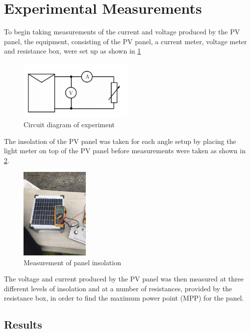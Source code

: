 \documentclass{article}
\begin{document}
	\section{Experimental Measurements}
		To begin taking measurements of the current and voltage produced by the PV panel, the equipment, consisting of the PV panel, a current meter, voltage meter and resistance box, were set up as shown in \cref{fig:circuit}
		\begin{figure}[H]
			\centering
			\includegraphics[width=0.5\textwidth]{circuitdiagram}
			\caption{Circuit diagram of experiment}
			\label{fig:circuit}
		\end{figure}
		The insolation of the PV panel was taken for each angle setup by placing the light meter on top of the PV panel before measurements were taken as shown in \cref{fig:lux_reading}.
		\begin{figure}[H]
			\centering
			\includegraphics[width=0.3\textwidth]{lux_reading}
			\caption{Measurement of panel insolation}
			\label{fig:lux_reading}
		\end{figure}
		The voltage and current produced by the PV panel was then measured at three different levels of insolation and at a number of resistances, provided by the resistance box, in order to find the maximum power point (MPP) for the panel.
		
	\subsection{Results}\label{section:Results}
	
\end{document}
